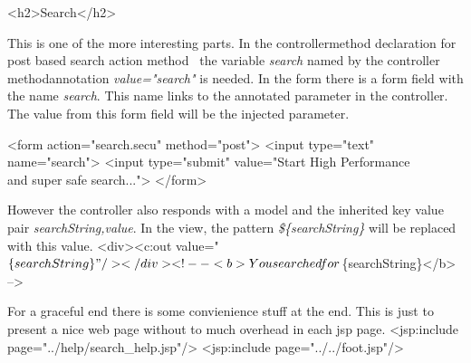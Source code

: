 \documentclass{llncs}%
\begin{document}
<h2>Search</h2>
\nwendcode{}\nwdocspar

This is one of the more interesting parts. In the controllermethod {\Tt{}\LA{}declaration for post based search action method~{\nwtagstyle{}}\RA{}\nwendquote} the variable {\em search} named by the controller methodannotation {\em value="search"} is needed. In the form there is a form field with the name {\em search}. This name links to the annotated parameter in the controller. The value from this form field will be the injected parameter. 

\nwenddocs{}\endmoddef\nwstartdeflinemarkup{}\nwenddeflinemarkup
<form action="search.secu" method="post">
    <input type="text" name="search">
    <input type="submit" value="Start High Performance \\
        and super safe search...">
</form>
\nwendcode{}\nwdocspar

However the controller also responds with a model and the inherited key value pair {\em searchString,value}. In the view, the pattern {\em \$\{searchString\}} will be replaced with this value.
\nwenddocs{}\endmoddef\nwstartdeflinemarkup{}\nwenddeflinemarkup
<div><c:out value="$\{searchString\}"/></div>
 <!--
<b>You searched for $\{searchString\}</b>          -->
\nwendcode{}\nwdocspar

For a graceful end there is some convienience stuff at the end. This is just to present a nice web page without to much overhead in each jsp page.
\nwenddocs{}\endmoddef\nwstartdeflinemarkup{}\nwenddeflinemarkup
<jsp:include page="../help/search_help.jsp"/>
<jsp:include page="../../foot.jsp"/>
\nwendcode{}\nwdocspar
\end{document}
